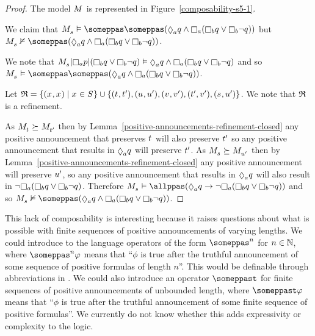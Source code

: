 \begin{proof}
    The model $\kModel$ is represented in Figure~\ref{composability-s5-1}.

    We claim that $\kPModel{\kStateS} \entails \someppas \someppas (\suspects[\agentA] \atomQ \land \knows[\agentA] (\knows[\agentB] \atomQ \lor \knows[\agentB] \neg \atomQ))$ but $\kPModel{\kStateS} \nentails \someppas (\suspects[\agentA] \atomQ \land \knows[\agentA] (\knows[\agentB] \atomQ \lor \knows[\agentB] \neg \atomQ))$.

    We note that $\restrict{\restrict{\kPModel{\kStateS}}{\knows[\agentA] \atomP}}{(\knows[\agentB] \atomQ \lor \knows[\agentB] \neg \atomQ)} \entails \suspects[\agentA] \atomQ \land \knows[\agentA] (\knows[\agentB] \atomQ \lor \knows[\agentB] \neg \atomQ)$ and so $\kPModel{\kStateS} \entails \someppas \someppas (\suspects[\agentA] \atomQ \land \knows[\agentA] (\knows[\agentB] \atomQ \lor \knows[\agentB] \neg \atomQ))$.

    Let $\refinement = \{(\kStateX, \kStateX) \mid \kStateX \in \kStates\} \cup \{(\kStateT, \kStateT[\prime]), (\kStateU, \kStateU[\prime]), (\kStateV, \kStateV[\prime]), (\kStateT[\prime], \kStateV[\prime]), (\kStateS, \kStateU[\prime])\}$. 
    We note that $\refinement$ is a refinement.

    As $\kPModel{\kStateT} \simulates \kPModel{\kStateT[\prime]}$ then by Lemma~\ref{positive-announcements-refinement-closed} any positive announcement that preserves $\kStateT$ will also preserve $\kStateT[\prime]$ so any positive announcement that results in $\suspects[\agentA] \atomQ$ will preserve $\kStateT[\prime]$.
    As $\kPModel{\kStateS} \simulates \kPModel{\kStateU[\prime]}$ then by Lemma~\ref{positive-announcements-refinement-closed} any positive announcement will preserve $\kStateU[\prime]$, so any positive announcement that results in $\suspects[\agentA] \atomQ$ will also result in $\neg \knows[\agentA] (\knows[\agentB] \atomQ \lor \knows[\agentB] \neg \atomQ)$.
    Therefore $\kPModel{\kStateS} \entails \allppas (\suspects[\agentA] \atomQ \implies \neg \knows[\agentA] (\knows[\agentB] \atomQ \lor \knows[\agentB] \neg \atomQ))$ and so $\kPModel{\kStateS} \nentails \someppas (\suspects[\agentA] \atomQ \land \knows[\agentA] (\knows[\agentB] \atomQ \lor \knows[\agentB] \neg \atomQ))$.
\end{proof}

This lack of composability is interesting because it raises questions about what is possible with finite sequences of positive announcements of varying lengths.
We could introduce to the language operators of the form $\someppas^n$ for $n \in \naturals$, where $\someppas^n \phi$ means that ``$\phi$ is true after the truthful announcement of some sequence of positive formulas of length $n$''.
This would be definable through abbreviations in \langPapal{}.
We could also introduce an operator $\someppast$ for finite sequences of positive announcements of unbounded length, where $\someppast \phi$ means that ``$\phi$ is true after the truthful announcement of some finite sequence of positive formulas''.
We currently do not know whether this adds expressivity or complexity to the logic.

